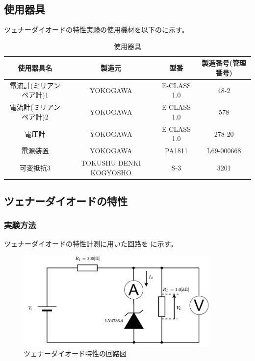 \subsection{使用器具}
	ツェナーダイオードの特性実験の使用機材を以下のに示す。
	\begin{table}[hbt]
		\centering
		\caption{使用器具}
		\begin{tabular}{|c||c|c|c|} \hline
				使用器具名 & 製造元 & 型番 & 製造番号(管理番号)\\ \hline
				電流計(ミリアンペア計)1 & YOKOGAWA & E-CLASS 1.0 & 48-2 \\ \hline
				電流計(ミリアンペア計)2 & YOKOGAWA & E-CLASS 1.0 & 578 \\ \hline
				電圧計 & YOKOGAWA & E-CLASS 1.0 & 278-20 \\ \hline
				電源装置 & YOKOGAWA & PA1811 & L69-000668 \\ \hline
				可変抵抗3 & TOKUSHU DENKI KOGYOSHO & S-3 & 3201 \\ \hline
		\end{tabular}
		\label{tab:zenerDiode_apparatus}
	\end{table}

\subsection{ツェナーダイオードの特性}
\subsubsection{実験方法}
	ツェナーダイオードの特性計測に用いた回路を に示す。

	\begin{figure}[!h]
    \centering
    \includegraphics[width=10cm]{./pdfs/zener_diode1.pdf}
    \caption{ツェナーダイオード特性の回路図}
    \label{fig:zenerDiode1_circuit}
  \end{figure}
	
